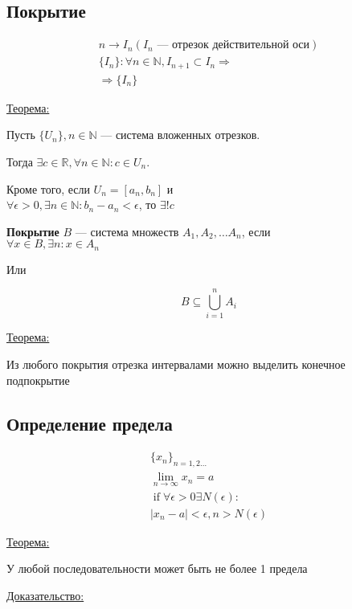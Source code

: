 \documentclass{article}
\DeclareMathOperator*{\If}{if}
\begin{document}
\subsection{Покрытие}

\begin{gather*}
	n \rightarrow I_n (\text{$I_n$ --- отрезок действительной оси}) \\
	\{ I_n \} : \forall n \in \mathbb{N}, I_{n + 1} \subset I_n \Rightarrow \\
	\Rightarrow \{ I_n \}
\end{gather*}

\underline{Теорема:}

Пусть $\{ U_n \}, n \in \mathbb{N}$ --- система вложенных отрезков.

Тогда $\exists c \in \mathbb{R}, \forall n \in \mathbb{N} : c \in U_n$.

Кроме того, если $U_n = [a_n, b_n]$ и \\
$\forall \epsilon > 0, \exists n \in \mathbb{N} : b_n - a_n < \epsilon$, то $\exists ! c$

\textbf{Покрытие} $B$ --- система множеств $A_1, A_2, \dots A_n$, если \\
$\forall x \in B, \exists n : x \in A_n$ 

Или

\[
B \subseteq \bigcup \limits_{i=1}^{n} A_i
\]

\underline{Теорема:}

Из любого покрытия отрезка интервалами можно выделить конечное подпокрытие

\subsection{Определение предела}
\begin{gather*}
	\{x_n\}_{n = 1, 2 \dots} \\
	\lim_{n \to \infty} x_n = a \\
	\If \forall \epsilon > 0 \exists N(\epsilon) : \\
	|x_n - a| < \epsilon, n > N(\epsilon)
\end{gather*}

\underline{Теорема:}

У любой последовательности может быть не более 1 предела

\underline{Доказательство:}
\end{document}
